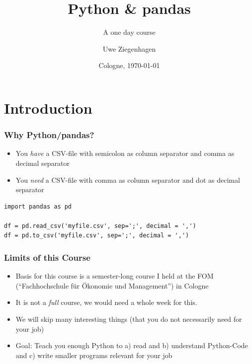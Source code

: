 \documentclass[ngerman]{beamer}
\author{Uwe Ziegenhagen}
\title{Python \& pandas}
\subtitle{A one day course}
\institute{\url{github.com/UweZiegenhagen/OneDayPythonPandasCourse}}
\date{Cologne, \today}
\begin{document}
\begin{frame}

\maketitle

\end{frame}

\section{Introduction}

\begin{frame}[fragile]
\frametitle{Why Python/pandas?}

\begin{itemize}
	\item You \textit{have} a CSV-file with semicolon as column separator and comma as decimal separator
	\item You \textit{need} a CSV-file with comma as column separator and dot as decimal separator
\end{itemize}

\begin{lstlisting}
import pandas as pd

df = pd.read_csv('myfile.csv', sep=';', decimal = ',')
df = pd.to_csv('myfile.csv', sep=';', decimal = ',')
\end{lstlisting}


\end{frame}

\begin{frame}
\frametitle{Limits of this Course}

\begin{itemize}
\item Basis for this course is a semester-long course I held at the FOM (\enquote{Fachhochschule für Ökonomie und Management}) in Cologne 
\item It is not a \textit{full} course, we would need a whole week for this.
\item We will skip many interesting things (that you do not necessarily need for your job)
\item Goal: Teach you enough Python to a) read and b) understand Python-Code and c) write smaller programs relevant for your job 
\end{itemize}
\end{frame}



\begin{frame}

\tableofcontents

\end{frame}
\end{document}
